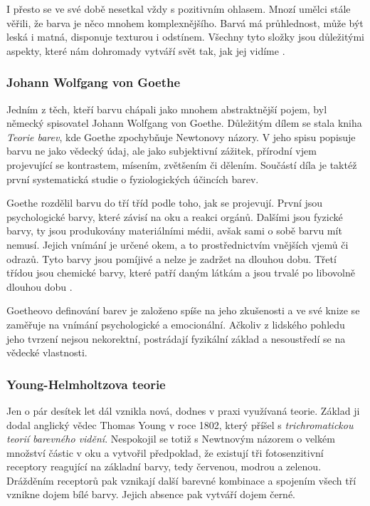 I přesto se ve své době nesetkal vždy s pozitivním ohlasem. Mnozí umělci stále věřili, 
že barva je něco mnohem komplexnějšího. Barvá má průhlednost, může být leská i matná, disponuje texturou i odstínem. Všechny tyto složky jsou důležitými aspekty, 
které nám dohromady vytváří svět tak, jak jej vidíme \cite{gage2023colour}.

\subsubsection{Johann Wolfgang von Goethe}
Jedním z těch, kteří barvu chápali jako mnohem abstraktnější pojem, byl německý spisovatel Johann Wolfgang von Goethe. Důležitým dílem se stala kniha \emph{Teorie barev}, kde Goethe zpochybňuje
Newtonovy názory. V jeho spisu popisuje barvu ne jako vědecký údaj, ale jako subjektivní zážitek, přírodní vjem projevující se kontrastem, mísením, zvětšením či dělením.
Součástí díla je taktéž první systematická studie o fyziologických účincích barev. 

Goethe rozdělil barvu do tří tříd podle toho, jak
se projevují. První jsou psychologické barvy, které závisí na oku a reakci orgánů. Dalšími jsou fyzické barvy, ty jsou produkovány materiálními médii, avšak sami o sobě barvu mít nemusí. Jejich vnímání je určené okem, a to 
prostřednictvím vnějších vjemů či odrazů. Tyto barvy jsou pomíjivé a nelze je zadržet na dlouhou dobu. Třetí třídou jsou chemické barvy, které patří daným látkám a jsou trvalé po libovolně dlouhou dobu \cite{goethe1840}.


Goetheovo definování barev je založeno spíše na jeho zkušenosti a ve své knize se zaměřuje na vnímání psychologické a emocionální.
Ačkoliv z lidského pohledu jeho tvrzení nejsou nekorektní, postrádají fyzikální základ a nesoustředí se na vědecké vlastnosti. 

\subsubsection{Young-Helmholtzova teorie}
Jen o pár desítek let dál vznikla nová, dodnes v praxi využívaná teorie. Základ ji dodal anglický vědec Thomas Young v roce 1802, který
příšel s \emph{trichromatickou teorií barevného vidění}. Nespokojil se totiž s Newtnovým názorem o velkém množství částic v oku a vytvořil
předpoklad, že existují tři fotosenzitivní receptory reagující na základní barvy, tedy červenou, modrou a zelenou. Drážděním receptorů pak 
vznikají další barevné kombinace a spojením všech tří vznikne dojem bílé barvy. Jejich absence pak vytváří dojem černé.

